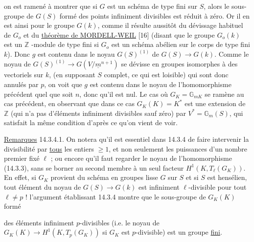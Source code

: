
on est ramené à montrer que si $G$ est un schéma de type fini sur $S$, alors le sous-groupe de $G(S)$ formé des points infiniment divisibles est réduit à zéro. Or il en est ainsi pour le groupe $G(k)$, comme il résulte aussitôt du dévissage habituel de $G_o$ et du \underline{théorème de MORDELL-WEIL} [16] (disant que le groupe $G_o(k)$ est un $\mathbb{Z}$ -module de type fini si $G_o$ est un schéma abélien sur le corps de type fini $k$). Donc $g$ est contenu dans le noyau $G(S)^{(1)}$ de $G(S) \longrightarrow G(k)$. Comme le noyau de $G(S)^{(1)} \longrightarrow G(V/\underline{m}^{n+1})$ se dévisse en groupes isomorphes à des vectoriels sur $k$, (en supposant $S$ complet, ce qui est loisible) qui sont donc annulés par $p$, on voit que $g$ est contenu dans le noyau de l'homomorphisme précédent quel que soit $n$, donc qu'il est nul. Le cas où $G_K = \mathbb{G}_{mK}$ se ramène au cas précédent, en observant que dans ce cas $G_K(K) = K^*$ est une extension de $\mathbb{Z}$ (qui n'a pas d'éléments infiniment divisibles sauf zéro) par $V^* = \mathbb{G}_m(S)$, qui satisfait la même condition d'après ce qu'on vient de voir.

\underline{Remarques} 14.3.4.1. On notera qu'il est essentiel dans 14.3.4 de faire intervenir la divisibilité par \underline{tous} les entiers $\geq 1$, et non seulement les puissances d'un nombre premier fixé $\ell$ ; ou encore qu'il faut regarder le noyau de l'homomorphisme (14.3.3), sans se borner au second membre à un seul facteur $H^1(K, T_\ell(G_K))$. En effet, si $G_K$ provient du schéma en groupes lisse $G$ sur $S$ et si $S$ est hensélien, tout élément du noyau de $G(S) \longrightarrow G(k)$ est infiniment $\ell$-divisible pour tout $\ell \neq p$ ! l'argument établissant 14.3.4 montre que le sous-groupe de $G_K(K)$ formé



des éléments infiniment $p$-divisibles (i.e. le noyau de $G_K(K) \to H^1(K,T_p(G_K))$ si $G_K$ est $p$-divisible) est un groupe \underline{fini}.

